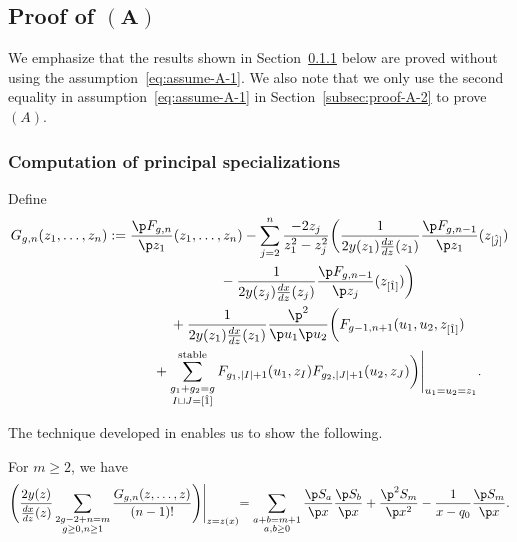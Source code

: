 \subsection[Proof of $(A)$]{Proof of $\boldsymbol{(A)}$}
\label{section:proof-of-A}

We emphasize that the results shown in Section~\ref{subsec:proof-A-1} below
are proved without using the assumption~\eqref{eq:assume-A-1}.
We also note that we only use the second equality
in assumption~\eqref{eq:assume-A-1} in Section~\ref{subsec:proof-A-2}
to prove~$(A)$.

\subsubsection{Computation of principal specializations}
\label{subsec:proof-A-1}

Def\/ine
\begin{gather}
G_{g,n}(z_{1},\dots,z_{n}) :=
\frac{\p F_{g,n}}{\p z_{1}}(z_{1},\dots,z_{n})-\sum_{j=2}^{n} \frac{-2z_{j}}{z_{1}^{2}-z_{j}^{2}}
\biggl( \frac{1}{2y(z_{1})\frac{dx}{dz}(z_{1})}
\frac{\p F_{g,n-1}}{\p z_{1}}(z_{[\hat{j}]})
\nonumber\\
\hphantom{G_{g,n}(z_{1},\dots,z_{n}) :=}{}
 - \frac{1}{2y(z_{j})\frac{dx}{dz}(z_{j})}
\frac{\p F_{g,n-1}}{\p z_{j}}(z_{[\hat{1}]}) \biggr)
\nonumber\\
\hphantom{G_{g,n}(z_{1},\dots,z_{n}) :=}{}
+ \frac{1}{2y(z_{1})\frac{dx}{dz}(z_{1})} \frac{\p^{2}}{\p u_{1} \p u_{2}}
\biggl( F_{g-1,n+1}(u_{1},u_{2},z_{[\hat{1}]})\nonumber\\
\hphantom{G_{g,n}(z_{1},\dots,z_{n}) :=}{}
+ \sum_{\substack{g_{1}+g_{2}=g \\ I \sqcup J = [\hat{1}]}}^{\rm stable}
F_{g_{1}, |I|+1}(u_{1},z_{I}) F_{g_{2}, |J|+1}(u_{2}, z_{J})
\biggr)\Biggr|_{u_{1}=u_{2}=z_{1}}.
\label{eq:Ggn}
\end{gather}

The technique developed in
\cite{DM14, DM14-2} enables us to show the following.

\begin{lem} 
\label{prop:partial-Riccati}
For $m \ge 2$, we have
\begin{gather} \label{eq:partial-Riccati}
\Biggl(\frac{2y(z)}{\frac{dx}{dz}(z)}
\sum_{\substack{2g-2+n=m \\ g\ge0, n\ge 1}}
\frac{G_{g,n}(z,\dots,z)}{(n-1)!} \Biggr)\Biggl|_{z=z(x)} =
\sum_{\substack{a+b=m+1 \\ a,b \ge 0}}
\frac{\p S_{a}}{\p x} \frac{\p S_{b}}{\p x} +
\frac{\p^{2} S_{m}}{\p x^{2}} - \frac{1}{x-q_{0}} \frac{\p S_{m}}{\p x}.
\end{gather}
\end{lem}

